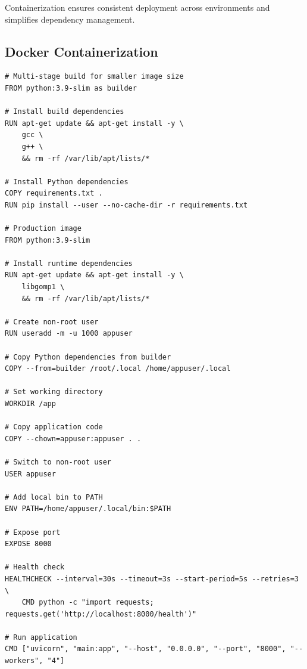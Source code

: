 Containerization ensures consistent deployment across environments and simplifies dependency management.

\subsection{Docker Containerization}

\begin{lstlisting}[language=docker, caption={Production Dockerfile for Model Serving}]
# Multi-stage build for smaller image size
FROM python:3.9-slim as builder

# Install build dependencies
RUN apt-get update && apt-get install -y \
    gcc \
    g++ \
    && rm -rf /var/lib/apt/lists/*

# Install Python dependencies
COPY requirements.txt .
RUN pip install --user --no-cache-dir -r requirements.txt

# Production image
FROM python:3.9-slim

# Install runtime dependencies
RUN apt-get update && apt-get install -y \
    libgomp1 \
    && rm -rf /var/lib/apt/lists/*

# Create non-root user
RUN useradd -m -u 1000 appuser

# Copy Python dependencies from builder
COPY --from=builder /root/.local /home/appuser/.local

# Set working directory
WORKDIR /app

# Copy application code
COPY --chown=appuser:appuser . .

# Switch to non-root user
USER appuser

# Add local bin to PATH
ENV PATH=/home/appuser/.local/bin:$PATH

# Expose port
EXPOSE 8000

# Health check
HEALTHCHECK --interval=30s --timeout=3s --start-period=5s --retries=3 \
    CMD python -c "import requests; requests.get('http://localhost:8000/health')"

# Run application
CMD ["uvicorn", "main:app", "--host", "0.0.0.0", "--port", "8000", "--workers", "4"]
\end{lstlisting}

